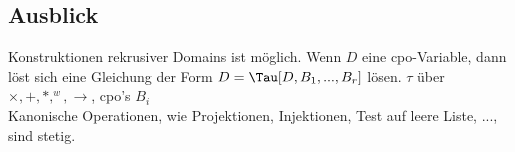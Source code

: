 \subsection{Ausblick}
\item[Ausblick:] Konstruktionen rekrusiver Domains ist möglich. Wenn $D$ eine cpo-Variable, dann löst sich eine Gleichung der Form $D = \Tau [D, B_1,...,B_r]$ lösen. $\tau$ über $\times, +, *, ^w, \rightarrow$, cpo's $B_i$\\ 

Kanonische Operationen, wie Projektionen, Injektionen, Test auf leere Liste, ..., sind stetig.